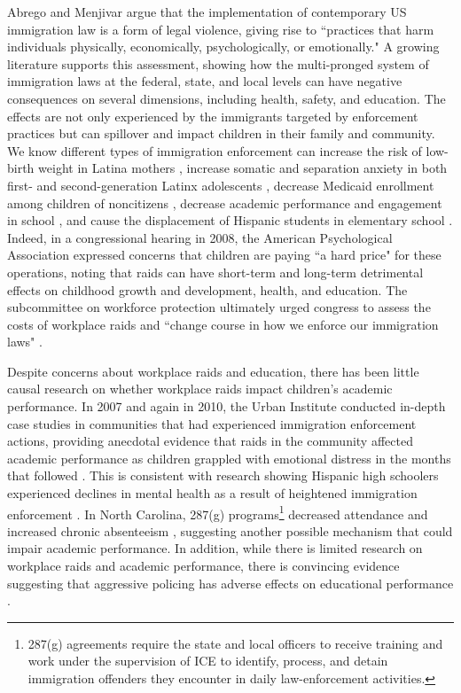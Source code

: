 \documentclass[hidelinks,twoside]{article}
\begin{document}
Abrego and Menjivar \citeyearpar{abrego_2011_immigrant} argue that the implementation of contemporary US immigration law is a form of legal violence, giving rise to ``practices that harm individuals physically, economically, psychologically, or emotionally." A growing literature supports this assessment, showing how the multi-pronged system of immigration laws at the federal, state, and local levels can have negative consequences on several dimensions, including health, safety, and education. The effects are not only experienced by the immigrants targeted by enforcement practices but can spillover and impact children in their family and community. We know different types of immigration enforcement can increase the risk of low-birth weight in Latina mothers \citep{novak_2017_change,torche_2019_restrictive},  increase somatic and separation anxiety in both first- and second-generation Latinx adolescents \citep{cardoso_2021_immigration}, decrease Medicaid enrollment among children of noncitizens \citep{watson_2014_inside}, decrease academic performance and engagement in school \citep{bellows_2019_immigration,bellows_2021_the}, and cause the displacement of Hispanic students in elementary school \citep{dee_2019_vanished}. Indeed, in a congressional hearing in 2008, the American Psychological Association expressed concerns that children are paying ``a hard price" for these operations, noting that raids can have short-term and long-term detrimental effects on childhood growth and development, health, and education. The subcommittee on workforce protection ultimately urged congress to assess the costs of workplace raids and ``change course in how we enforce our immigration laws" \citep{committeeonlabor_2008_ice}.

Despite concerns about workplace raids and education, there has been little causal research on whether workplace raids impact children's academic performance. In 2007 and again in 2010, the Urban Institute conducted in-depth case studies in communities that had experienced immigration enforcement actions, providing anecdotal evidence that raids in the community affected academic performance as children grappled with emotional distress in the months that followed \citep{capps_2007_paying,chaudry_2010_children}. This is consistent with research showing Hispanic high schoolers experienced declines in mental health as a result of heightened immigration enforcement \citep{cardoso_2021_immigration}. In North Carolina, 287(g) programs\footnote{287(g) agreements require the state and local officers to receive training and work under the supervision of ICE to identify, process, and detain immigration offenders they encounter in daily law-enforcement activities.} decreased attendance and increased chronic absenteeism \citep{bellows_2021_the}, suggesting another possible mechanism that could impair academic performance. In addition, while there is limited research on workplace raids and academic performance, there is convincing evidence suggesting that aggressive policing has adverse effects on educational performance \citep{legewie_2019_aggressive}. 
\end{document}
